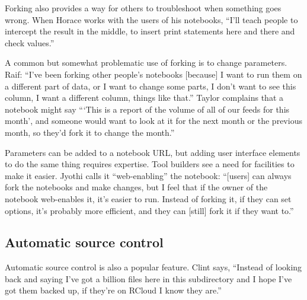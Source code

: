 Forking also provides a way for others to troubleshoot when something goes
wrong.  When Horace works with the users of his notebooks, ``I'll teach people
to intercept the result in the middle, to insert print statements here and
there and check values.''



A common but somewhat problematic use of forking is to change
parameters. Raif: ``I've been forking other people's notebooks [because] I
want to run them on a different part of data, or I want to change some parts,
I don't want to see this column, I want a different column, things like
that.''  Taylor complains that a notebook might say ```This is a report of
the volume of all of our feeds for this month', and someone would want to
look at it for the next month or the previous month, so they'd fork it to
change the month.''

Parameters can be added to a notebook URL, but adding user interface
elements to do the same thing requires expertise. Tool builders see a
need for facilities to make it easier. Jyothi calls it ``web-enabling'' the
notebook: ``[users] can always fork the notebooks and make changes, but I
feel that if the owner of the notebook web-enables it, it's easier to
run. Instead of forking it, if they can set options, it's probably more
efficient, and they can [still] fork it if they want to.''


\subsection{Automatic source control}

Automatic source control is also a popular feature. Clint says, ``Instead of
looking back and saying I've got a billion files here in this subdirectory and I
hope I've got them backed up, if they're on RCloud I know they are.''

